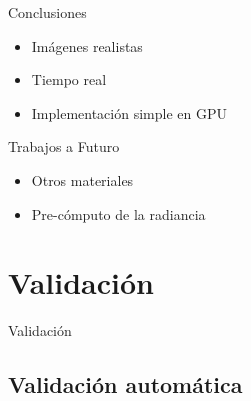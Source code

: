 \documentclass[spanish,unknownkeysallowed]{beamer}
\begin{document}








\begin{frame}{Conclusiones}
\begin{itemize}
\item Imágenes realistas
\item Tiempo real
\item Implementación simple en GPU
\end{itemize}

\begin{block}{Trabajos a Futuro}
\begin{itemize}
\item Otros materiales
\item Pre-cómputo de la radiancia
\end{itemize}
\end{block}
\end{frame}

\section{Validación}



\begin{frame}
\begin{block}{}
\begin{center}
\vspace{1cm}
\huge{Validación}
\vspace{1cm}
\end{center}
\end{block}
\end{frame}


\subsection{Validación automática}
\end{document}
